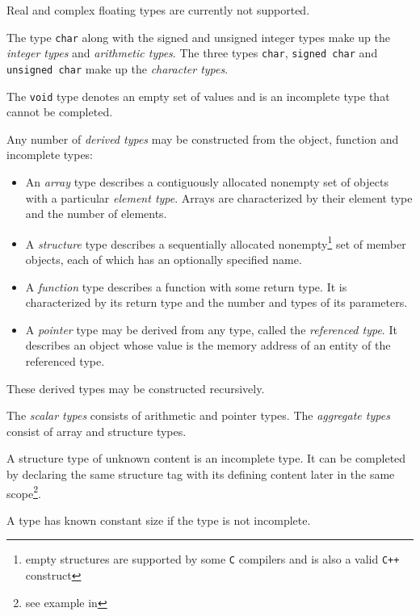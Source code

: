 {{Real and complex floating types are currently not supported.
}
\par
The type \Verb!char! along with the signed and unsigned integer types make up the \emph{integer types} and \emph{arithmetic types}.
The three types \Verb!char!, \Verb!signed char! and \Verb!unsigned char! make up the \emph{character types}.
\par
{}
\par
The \Verb!void! type denotes an empty set of values and is an incomplete type that cannot be completed.
\par
Any number of \emph{derived types} may be constructed from the object, function and incomplete types:
\begin{itemize}
    \item An \emph{array} type describes a contiguously allocated nonempty set of objects with a particular \emph{element type}.
    Arrays are characterized by their element type and the number of elements.
    \item A \emph{structure} type describes a sequentially allocated nonempty\footnote{empty structures are supported by some \Verb!C! compilers and is also a valid \Verb!C++! construct} set of member objects, each of which has an optionally specified name.
    \item A \emph{function} type describes a function with some return type.
    It is characterized by its return type and the number and types of its parameters.
    \item A \emph{pointer} type may be derived from any type, called the \emph{referenced type}.
    It describes an object whose value is the memory address of an entity of the referenced type.
\end{itemize}
These derived types may be constructed recursively.
\par
{}
\par
The \emph{scalar types} consists of arithmetic and pointer types.
The \emph{aggregate types} consist of array and structure types.
\par
{}
\par
A structure type of unknown content is an incomplete type.
It can be completed by declaring the same structure tag with its defining content later in the same scope\footnote{see example in }.
\par
A type has known constant size if the type is not incomplete.
\par
{}
\par
{}
}

